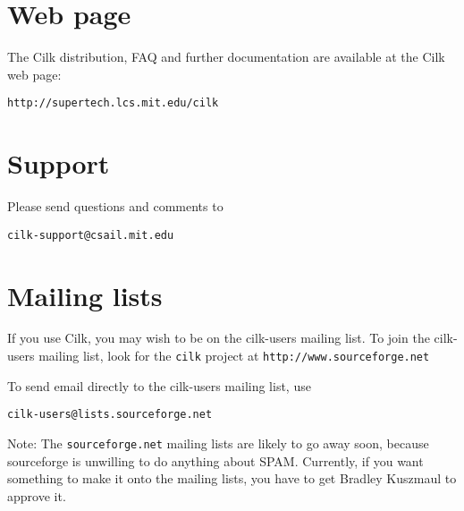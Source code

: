
\bigskip
\bigskip

\section*{Web page}

The Cilk distribution, FAQ and further documentation are available at
the Cilk web page:

\begin{center}
\large
\texttt{http://supertech.lcs.mit.edu/cilk}
\end{center}

\bigskip
\bigskip


\section*{Support}

Please send questions and comments to
\begin{center}
\tt cilk-support@csail.mit.edu
\end{center}

\section*{Mailing lists}
\label{mailinglists}

If you use Cilk, you may wish to be on the cilk-users mailing list.
To join the cilk-users mailing list, look for the \texttt{cilk} project
at \texttt{http://www.sourceforge.net}

To send email directly to the cilk-users mailing list, use
\begin{center}
\texttt{cilk-users@lists.sourceforge.net}
\end{center}

Note: The {\tt sourceforge.net} mailing lists are likely to go away
soon, because sourceforge is unwilling to do anything about SPAM\@.
Currently, if you want something to make it onto the mailing lists,
you have to get Bradley Kuszmaul to approve it.

